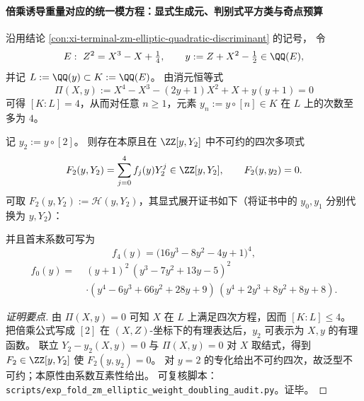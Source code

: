 \paragraph{倍乘诱导重量对应的统一模方程：显式生成元、判别式平方类与奇点预算}
沿用结论 \ref{con:xi-terminal-zm-elliptic-quadratic-discriminant} 的记号，
令
\[
E:\ Z^{2}=X^{3}-X+\tfrac14,\qquad
y:=Z+X^{2}-\tfrac12\in\QQ(E),
\]
并记 \(L:=\QQ(y)\subset K:=\QQ(E)\)。
由消元恒等式
\[
\Pi(X,y):=X^{4}-X^{3}-(2y+1)X^{2}+X+y(y+1)=0
\]
可得 \([K:L]=4\)，从而对任意 \(n\ge 1\)，元素 \(y_n:=y\circ[n]\in K\) 在 \(L\) 上的次数至多为 \(4\)。

\begin{conclusion}\label{con:xi-terminal-zm-elliptic-weight-modular-equation-double-explicit}
记 \(y_2:=y\circ[2]\)。
则存在本原且在 \(\ZZ[y,Y_2]\) 中不可约的四次多项式
\[
F_2(y,Y_2)=\sum_{j=0}^{4}f_j(y)Y_2^j\in\ZZ[y,Y_2],
\qquad
F_2(y,y_2)=0.
\]
可取 \(F_2(y,Y_2):=\mathcal{H}(y,Y_2)\)，其显式展开证书如下（将证书中的 \(y_0,y_1\) 分别代换为 \(y,Y_2\)）：

并且首末系数可写为
\[
f_4(y)=\bigl(16y^{3}-8y^{2}-4y+1\bigr)^{4},
\]
\[
\begin{aligned}
f_0(y)=\;&(y+1)^2\,(y^3-7y^2+13y-5)^2\\
&\cdot (y^4-6y^3+66y^2+28y+9)\,(y^4+2y^3+8y^2+8y+8).
\end{aligned}
\]
\end{conclusion}
\begin{proof}[证明要点]
由 \(\Pi(X,y)=0\) 可知 \(X\) 在 \(L\) 上满足四次方程，因而 \([K:L]\le 4\)。
把倍乘公式写成 \([2]\) 在 \((X,Z)\)-坐标下的有理表达后，\(y_2\) 可表示为 \(X,y\) 的有理函数。
联立 \(Y_2-y_2(X,y)=0\) 与 \(\Pi(X,y)=0\) 对 \(X\) 取结式，得到 \(F_2\in\ZZ[y,Y_2]\) 使 \(F_2(y,y_2)=0\)。
对 \(y=2\) 的专化给出不可约四次，故泛型不可约；本原性由系数互素性给出。
可复核脚本：\texttt{scripts/exp\_fold\_zm\_elliptic\_weight\_doubling\_audit.py}。证毕。
\end{proof}

